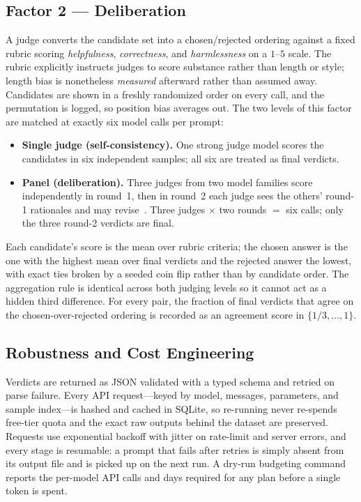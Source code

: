 \documentclass[conference]{IEEEtran}
\begin{document}
\subsection{Factor 2 --- Deliberation}
A judge converts the candidate set into a chosen/rejected ordering against a fixed
rubric scoring \emph{helpfulness}, \emph{correctness}, and \emph{harmlessness} on a
$1$--$5$ scale. The rubric explicitly instructs judges to score substance rather
than length or style; length bias is nonetheless \emph{measured} afterward rather
than assumed away. Candidates are shown in a freshly randomized order on every
call, and the permutation is logged, so position bias averages out. The two levels
of this factor are matched at exactly six model calls per prompt:
\begin{itemize}
\item \textbf{Single judge (self-consistency).} One strong judge model scores the
candidates in six independent samples; all six are treated as final verdicts.
\item \textbf{Panel (deliberation).} Three judges from two model families score
independently in round~1, then in round~2 each judge sees the others' round-1
rationales and may revise~\cite{du2023debate}. Three judges $\times$ two rounds
$=$ six calls; only the three round-2 verdicts are final.
\end{itemize}
Each candidate's score is the mean over rubric criteria; the chosen answer is the
one with the highest mean over final verdicts and the rejected answer the lowest,
with exact ties broken by a seeded coin flip rather than by candidate order. The
aggregation rule is identical across both judging levels so it cannot act as a
hidden third difference. For every pair, the fraction of final verdicts that agree
on the chosen-over-rejected ordering is recorded as an agreement score in
$\{1/3,\dots,1\}$.

\subsection{Robustness and Cost Engineering}
Verdicts are returned as JSON validated with a typed schema and retried on parse
failure. Every API request---keyed by model, messages, parameters, and sample
index---is hashed and cached in SQLite, so re-running never re-spends free-tier
quota and the exact raw outputs behind the dataset are preserved. Requests use
exponential backoff with jitter on rate-limit and server errors, and every stage
is resumable: a prompt that fails after retries is simply absent from its output
file and is picked up on the next run. A dry-run budgeting command reports the
per-model API calls and days required for any plan before a single token is spent.
\end{document}
